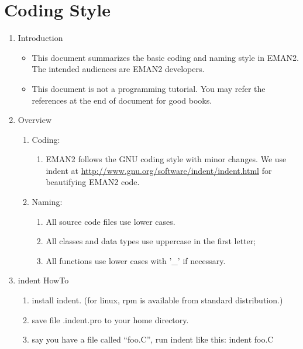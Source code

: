 %

\section {Coding Style}
 \label{CODING-STYLE} 

\begin{enumerate}
\item Introduction
\begin{itemize}
\item This document summarizes the basic coding and naming style in EMAN2. The intended audiences are EMAN2 developers.

\item This document is not a programming tutorial. You may refer the references at the end of document for good books.


\end{itemize}
\item Overview

\begin{enumerate}
  \item Coding:
    \begin{enumerate}
      \item EMAN2 follows the GNU coding style with minor changes. We use indent at \href{http://www.gnu.org/software/indent/indent.html}{http://www.gnu.org/software/indent/indent.html} for beautifying EMAN2 code. 
    \end{enumerate}
  \item Naming:
    \begin{enumerate}
       \item All source code files use lower cases.
       \item All classes and data types use uppercase in the first letter; 
       \item All functions use lower cases with '\_' if necessary.
     \end{enumerate}
\end{enumerate}

 
\item indent HowTo
\begin{enumerate}

\item  install indent. (for linux, rpm is available from standard distribution.) 
\item save file .indent.pro to your home directory.
\item say you have a file called ``foo.C'', run indent like this: indent foo.C


\end{enumerate}
\end{enumerate}
